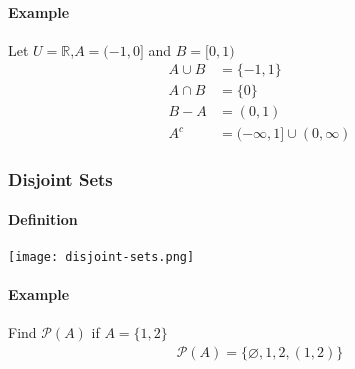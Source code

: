 \paragraph*{Example}
Let $U = \mathbb{R}$,$A = (-1, 0]$ and $B = [0, 1)$
\begin{align*}
    A \cup B &= \{-1, 1\}\\
    A \cap B &= \{0\}\\
    B - A &= (0, 1)\\
    A^c &= (- \infty, 1] \cup (0, \infty)
\end{align*}

\subsubsection*{Disjoint Sets}
\paragraph*{Definition}
\begin{center}
\texttt{[image: disjoint-sets.png]}    
\end{center}


\paragraph*{Example}
Find $\mathcal{P}(A)$ if $A = \{1,2\}$
\begin{align*}
    \mathcal{P}(A) = \{\varnothing, 1, 2, (1,2)\}
\end{align*}